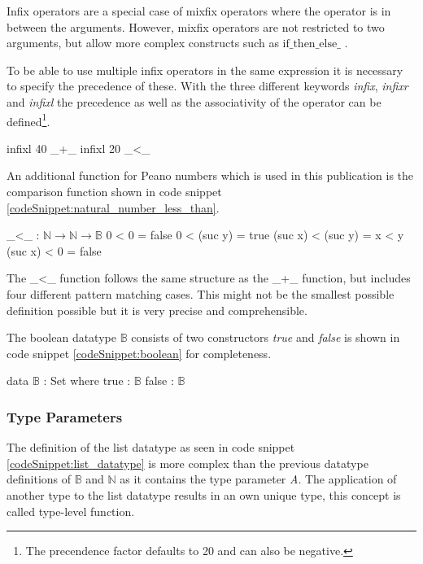 Infix operators are a special case of mixfix operators where the operator is in between the arguments.
However, mixfix operators are not restricted to two arguments, but allow more complex constructs such as $\text{if\_then\_else\_}$ \cite{AgdaReadTheDocs}.

To be able to use multiple infix operators in the same expression it is necessary to specify the precedence of these.
With the three different keywords \emph{infix}, \emph{infixr} and \emph{infixl} the precedence as well as the associativity of the operator can be defined\footnote{The precendence factor defaults to 20 and can also be negative.}.

\begin{codesnippet}[mathescape=true, caption={Precedence and associativity of some Peano number operators}, label={codeSnippet:natural_number_precedence}]
infixl 40 _+_
infixl 20 _<_
\end{codesnippet}

An additional function for Peano numbers which is used in this publication is the comparison function shown in code snippet \ref{codeSnippet:natural_number_less_than}.

\begin{codesnippet}[mathescape=true, caption={Peano numbers less-than}, label={codeSnippet:natural_number_less_than}]
_<_ : $\mathbb{N} \rightarrow \mathbb{N} \rightarrow \mathbb{B}$
0 < 0 = false
0 < (suc y) = true
(suc x) < (suc y) = x < y
(suc x) < 0 = false
\end{codesnippet}

The \_\textless\_ function follows the same structure as the \_+\_ function, but includes four different pattern matching cases. 
This might not be the smallest possible definition possible but it is very precise and comprehensible.

The boolean datatype $\mathbb{B}$ consists of two constructors \emph{true} and \emph{false} is shown in code snippet \ref{codeSnippet:boolean} for completeness.

\begin{codesnippet}[mathescape=true, caption={Definition of the boolean datatype in Agda}, label={codeSnippet:boolean}]
data $\mathbb{B}$ : Set where
  true : $\mathbb{B}$
  false  : $\mathbb{B}$
\end{codesnippet}

\subsubsection{Type Parameters}
The definition of the list datatype as seen in code snippet \ref{codeSnippet:list_datatype} is more complex than the previous datatype definitions of $\mathbb{B}$ and $\mathbb{N}$ as it contains the type parameter \emph{A}.
The application of another type to the list datatype results in an own unique type, this concept is called type-level function.

